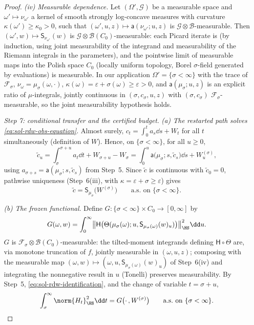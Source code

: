 \documentclass[../main.tex]{subfiles}
\begin{document}
\begin{proof}
\emph{(iv) Measurable dependence.}  Let $(\Omega',\mathcal G)$ be a measurable space
and $\omega'\mapsto\nu_{\omega'}$ a kernel of smooth strongly log-concave measures with
curvature $\kappa(\omega')\ge\kappa_0>0$, such that
$(\omega',u,z)\mapsto\mathsf a(\nu_{\omega'};u,z)$ is
$\mathcal G\otimes\mathcal B$-measurable.  Then
$(\omega',w)\mapsto\mathsf S_{\nu_{\omega'}}(w)$ is
$\mathcal G\otimes\mathcal B(C_0)$-measurable: each Picard iterate is (by induction,
using joint measurability of the integrand and measurability of the Riemann integrals
in the parameters), and the pointwise limit of measurable maps into the Polish space
$C_0$ (locally uniform topology, Borel $\sigma$-field generated by evaluations) is
measurable.  In our application $\Omega'=\{\sigma<\infty\}$ with the trace of
$\mathcal F_\sigma$, $\nu_\omega=\mu_\sigma(\omega,\cdot)$,
$\kappa(\omega)=\varepsilon+\sigma(\omega)\ge\varepsilon>0$, and
$\mathsf a(\mu_\sigma;u,z)$ is an explicit ratio of $\mu$-integrals, jointly continuous
in $(\sigma,c_\sigma,u,z)$ with $(\sigma,c_\sigma)$
$\mathcal F_\sigma$-measurable, so the joint measurability hypothesis holds.

\medskip
\noindent\emph{Step 7: conditional transfer and the certified budget.}
\emph{(a) The restarted path solves \eqref{eq:sol-rdw-obs-equation}.}  Almost surely,
$c_t=\int_0^ta_s\dd s+W_t$ for all $t$ simultaneously (definition of $W$).  Hence, on
$\{\sigma<\infty\}$, for all $u\ge0$,
\[
  \tilde c_u=\int_\sigma^{\sigma+u}a_t\dd t+W_{\sigma+u}-W_\sigma
  =\int_0^u\mathsf a\bigl(\mu_\sigma;s,\tilde c_s\bigr)\dd s+W^{(\sigma)}_u,
\]
using $a_{\sigma+s}=\mathsf a(\mu_\sigma;s,\tilde c_s)$ from Step~5.  Since $\tilde c$
is continuous with $\tilde c_0=0$, pathwise uniqueness (Step~6(iii), with
$\kappa=\varepsilon+\sigma\ge\varepsilon$) gives
\begin{equation}
  \tilde c=\mathsf S_{\mu_\sigma}\bigl(W^{(\sigma)}\bigr)
  \qquad\text{a.s.\ on }\{\sigma<\infty\}.
  \label{eq:sol-rdw-identification}
\end{equation}

\emph{(b) The frozen functional.}  Define
$G:\{\sigma<\infty\}\times C_0\to[0,\infty]$ by
\[
  G(\omega,w)
  =\int_0^\infty
  \bigl\|\mathsf H\bigl(\Theta(\mu_\sigma(\omega);u,
  \mathsf S_{\mu_\sigma(\omega)}(w)_u)\bigr)\bigr\|_{\HS}^2\dd u .
\]
$G$ is $\mathcal F_\sigma\otimes\mathcal B(C_0)$-measurable: the tilted-moment
integrands defining $\mathsf H\circ\Theta$ are, via monotone truncation of $f$,
jointly measurable in $(\omega,u,z)$; composing with the measurable map
$(\omega,w)\mapsto(\omega,u,\mathsf S_{\mu_\sigma(\omega)}(w)_u)$ of Step~6(iv) and
integrating the nonnegative result in $u$ (Tonelli) preserves measurability.  By
Step~5, \eqref{eq:sol-rdw-identification}, and the change of variable $t=\sigma+u$,
\begin{equation}
  \int_\sigma^\infty\norm{H_t}_{\HS}^2\dd t
  =G\bigl(\cdot\,,W^{(\sigma)}\bigr)
  \qquad\text{a.s.\ on }\{\sigma<\infty\}.
  \label{eq:sol-rdw-pathwise-identity}
\end{equation}


\end{proof}
\end{document}
